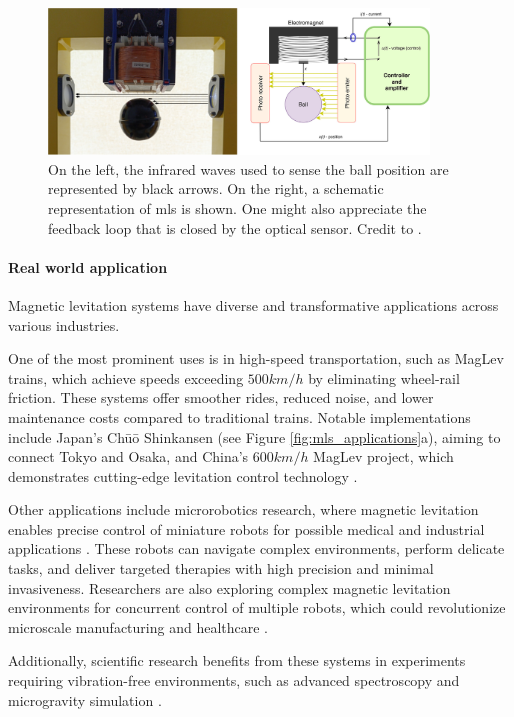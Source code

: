 \begin{figure}[H]
    \centering
    \includegraphics[width=0.9\textwidth]{./img/magLev_general_scheme.png}
    \caption{On the left, the infrared waves used to sense the ball position are represented by black arrows. On the right, a schematic representation of \acrshort{mls} is shown. One might also appreciate the feedback loop that is closed by the optical sensor. Credit to \cite{Jastrzębski2024}.}
    \label{fig:MLS_general_scheme}
\end{figure}

\paragraph{Real world application}

Magnetic levitation systems have diverse and transformative applications across various industries.

One of the most prominent uses is in high-speed transportation, such as MagLev trains, which achieve speeds exceeding $500 km/h$ by eliminating wheel-rail friction.
These systems offer smoother rides, reduced noise, and lower maintenance costs compared to traditional trains.
Notable implementations include Japan's Chūō Shinkansen (see Figure \ref{fig:mls_applications}a), aiming to connect Tokyo and Osaka, and China's $600 km/h$ MagLev project, which demonstrates cutting-edge levitation control technology \cite{WikiSCMaglev}.

Other applications include microrobotics research, where magnetic levitation enables precise control of miniature robots for possible medical and industrial applications \cite{microrobotsControl}.
These robots can navigate complex environments, perform delicate tasks, and deliver targeted therapies with high precision and minimal invasiveness.
Researchers are also exploring complex magnetic levitation environments for concurrent control of multiple robots, which could revolutionize microscale manufacturing and healthcare \cite{Independent3DControl}.

Additionally, scientific research benefits from these systems in experiments requiring vibration-free environments, such as advanced spectroscopy \cite{spectroscopy} and microgravity simulation \cite{microgravity}.


